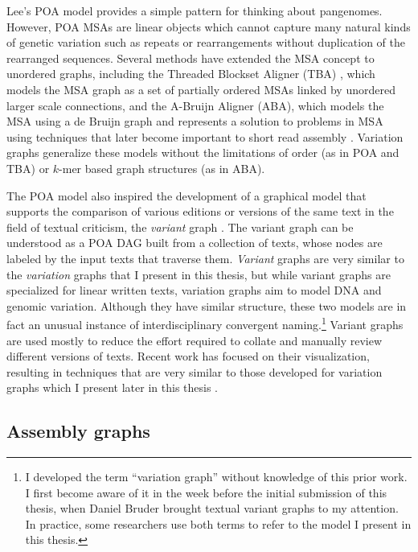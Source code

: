 Lee's POA model provides a simple pattern for thinking about pangenomes.
However, POA MSAs are linear objects which cannot capture many natural kinds of genetic variation such as repeats or rearrangements without duplication of the rearranged sequences.
Several methods have extended the MSA concept to unordered graphs, including the Threaded Blockset Aligner (TBA) \cite{blanchette2004aligning}, which models the MSA graph as a set of partially ordered MSAs linked by unordered larger scale connections, and the A-Bruijn Aligner (ABA), which models the MSA using a de Bruijn graph and represents a solution to problems in MSA using techniques that later become important to short read assembly \cite{raphael2004novel}.
Variation graphs generalize these models without the limitations of order (as in POA and TBA) or $k$-mer based graph structures (as in ABA).

The POA model also inspired the development of a graphical model that supports the comparison of various editions or versions of the same text in the field of textual criticism, the \emph{variant} graph \cite{schmidt2009data,haentjens2014computer}.
The variant graph can be understood as a POA DAG built from a collection of texts, whose nodes are labeled by the input texts that traverse them.
\emph{Variant} graphs are very similar to the \emph{variation} graphs that I present in this thesis, but while variant graphs are specialized for linear written texts, variation graphs aim to model DNA and genomic variation.
Although they have similar structure, these two models are in fact an unusual instance of interdisciplinary convergent naming.\footnote{I developed the term ``variation graph'' without knowledge of this prior work. I first become aware of it in the week before the initial submission of this thesis, when Daniel Bruder brought textual variant graphs to my attention. In practice, some researchers use both terms to refer to the model I present in this thesis.}
Variant graphs are used mostly to reduce the effort required to collate and manually review different versions of texts.
Recent work has focused on their visualization, resulting in techniques that are very similar to those developed for variation graphs which I present later in this thesis \cite{janicke2015traviz}.


\subsection{Assembly graphs}


